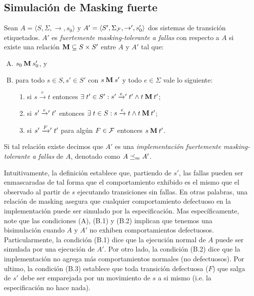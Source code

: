 \subsection{Simulación de Masking fuerte}
\begin{definition} \label{def:masking_rel}
  Sean $A =\langle S, \Sigma, \rightarrow, s_0\rangle$ y $A' =\langle S', \Sigma_{\mathcal{F}}, \rightarrow', s_0' \rangle$ dos sistemas de transición etiquetados.
  $A'$ es \emph{fuertemente masking-tolerante a fallas} con respecto a $A$ si existe una relación 
$\mathbin{\mathbf{M}} \subseteq S \times S'$ entre $A$ y $A'$ tal que:

\begin{enumerate}[(A)]
  \item $s_0 \mathbin{\mathbf{M}} s'_0$, y
  \item para todo $s \in S, s' \in S'$ con $s \mathbin{\mathbf{M}} s'$ y todo $e \in \Sigma$ vale lo siguiente:

  \begin{enumerate}[(1)]
    \item 
    si $s \xrightarrow{e} t$ entonces
    $\exists\; t' \in S': s' \mathrel{{\xrightarrow[]{e}}{}'} t'  \wedge t \mathbin{\mathbf{M}} t'$;

      \item si $s' \mathrel{{\xrightarrow[]{e}}{}'} t'$ entonces
      $\exists \; t \in S: s \xrightarrow{e} t \wedge t \mathbin{\mathbf{M}} t'$;

      \item si $s' \mathrel{{\xrightarrow[]{F}}{}'} t' $ para algún $F \in \mathcal{F}$ entonces
      $s \mathbin{\mathbf{M}} t'$.
      
  \end{enumerate}
\end{enumerate}

Si tal relación existe decimos que $A'$ es una \emph{implementación fuertemente masking-tolerante a fallas} de $A$, denotado como $A \preceq_{m} A'$. 
\end{definition}

 Intuitivamente, la definición establece que, partiendo de $s'$, las fallas pueden ser enmascaradas de tal forma que el comportamiento exhibido es el mismo que el observado al partir de $s$ ejecutando transiciones sin fallas. 
 En otras palabras, una relación de masking asegura que cualquier comportamiento defectuoso en la implementación puede ser simulado por la especificación. Mas específicamente, note que las condiciones (A), (B.1) y (B.2) implican que tenemos una bisimulación cuando $A$ y $A'$ no exhiben comportamientos defectuosos.
Particularmente, la condición (B.1) dice que la ejecución normal de $A$ puede ser simulada por una ejecución de $A'$. Por otro lado, la condición (B.2) dice que la implementación no agrega más comportamientos normales (no defectuosos). Por ultimo, la condición (B.3) establece que toda transición defectuosa ($F$) que salga de $s'$ debe ser emparejada por un movimiento de $s$ a si mismo (i.e. la especificación no hace nada).

